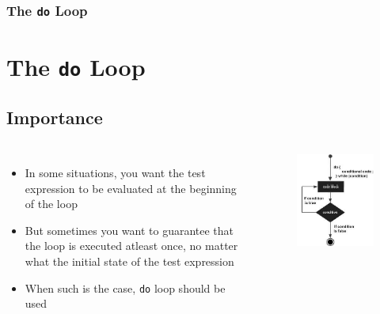\documentclass{beamer}
\begin{document}
\begin{frame}
    \frametitle{The \texttt{do} Loop}
    \section{The \texttt{do} Loop} %
    \label{sec:the_do_loop}
    \subsection{Importance} %
    \label{sub:importance_do}
    \begin{columns}
        \begin{itemize}
            \item In some situations, you want the test expression to be evaluated at the beginning of the loop
            \item But sometimes you want to guarantee that the loop is executed atleast once, no matter what the initial state of the test expression
            \item When such is the case, \texttt{do} loop should be used
        \end{itemize}
        \begin{figure}
            \centering
            \includegraphics[scale=0.45]{do}
        \end{figure}
    \end{columns}
\end{frame}
\end{document}
